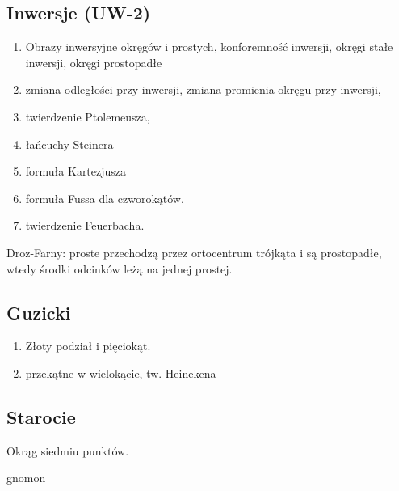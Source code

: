 

\subsection{Inwersje (UW-2)}
\begin{enumerate}
	\item Obrazy inwersyjne okręgów i prostych, konforemność inwersji, okręgi stałe inwersji, okręgi prostopadłe
	\item zmiana odległości przy inwersji, zmiana promienia okręgu przy inwersji,
	\item twierdzenie Ptolemeusza,
	\item łańcuchy Steinera
	\item formuła Kartezjusza
	\item formuła Fussa dla czworokątów,
	\item twierdzenie Feuerbacha.
\end{enumerate}

Droz-Farny: proste przechodzą przez ortocentrum trójkąta i są prostopadłe, wtedy środki odcinków leżą na jednej prostej.



\subsection{Guzicki}
\begin{enumerate}
	\item Złoty podział i pięciokąt.
	\item przekątne w wielokącie, tw. Heinekena %
\end{enumerate}

\subsection{Starocie}
Okrąg siedmiu punktów. %

gnomon %


%